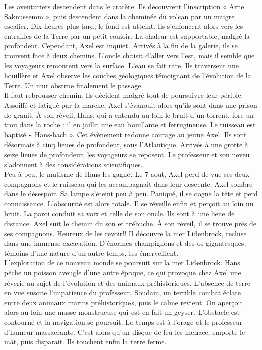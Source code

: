 \documentclass[12pt,a4paper]{article}
\begin{document}
{Les aventuriers descendent dans le cratère.
Ils découvrent l’inscription « Arne Saknussemm », puis descendent dans la cheminée du volcan par un maigre escalier.
Dix heures plus tard, le fond est atteint.
Ils s’enfoncent alors vers les entrailles de la Terre par un petit couloir.
La chaleur est supportable, malgré la profondeur.
Cependant, Axel est inquiet.
Arrivés à la fin de la galerie, ils se trouvent face à deux chemins.
L’oncle choisit d’aller vers l’est, mais il semble que les voyageurs remontent vers la surface.
L’eau se fait rare.
Ils traversent une houillère et Axel observe les couches géologiques témoignant de l’évolution de la Terre.
Un mur obstrue finalement le passage.\\

Il faut rebrousser chemin.
Ils décident malgré tout de poursuivre leur périple.
Assoiffé et fatigué par la marche, Axel s’évanouit alors qu’ils sont dans une prison de granit.
À son réveil, Hans, qui a entendu au loin le bruit d’un torrent, fore un trou dans la roche : il en jaillit une eau bouillante et ferrugineuse.
Le ruisseau est baptisé « Hans-bach ».
Cet évènement redonne courage au jeune Axel.
Ils sont désormais à cinq lieues de profondeur, sous l’Atlantique.
Arrivés à une grotte à seize lieues de profondeur, les voyageurs se reposent. 
Le professeur et son neveu s’adonnent à des considérations scientifiques.\\

Peu à peu, le mutisme de Hans les gagne.
Le 7 aout, Axel perd de vue ses deux compagnons et le ruisseau qui les accompagnait dans leur descente.
Axel sombre dans le désespoir.
Sa lampe s’éteint peu à peu.
Paniqué, il se cogne la tête et perd connaissance.
L’obscurité est alors totale.
Il se réveille enfin et perçoit au loin un bruit.
La paroi conduit sa voix et celle de son oncle.
Ils sont à une lieue de distance.
Axel suit le chemin du son et trébuche.
À son réveil, il se trouve près de ses compagnons. Heureux de les revoir!!
Il découvre la mer Lidenbrock, recluse dans une immense excavation.
D’énormes champignons et des os gigantesques, témoins d’une nature d’un autre temps, les émerveillent.\\

L’exploration de ce nouveau monde se poursuit sur la mer Lidenbrock. 
Hans pêche un poisson aveugle d’une autre époque, ce qui provoque chez Axel une rêverie au sujet de l’évolution et des animaux préhistoriques. 
L’absence de terre en vue suscite l’impatience du professeur. 
Soudain, un terrible combat éclate entre deux animaux marins préhistoriques, puis le calme revient. 
On aperçoit alors au loin une masse monstrueuse qui est en fait un geyser. 
L’obstacle est contourné et la navigation se poursuit.
Le temps est à l’orage et le professeur d’humeur massacrante. 
C’est alors qu’un disque de feu les menace, emporte le mât, puis disparait. 
Ils touchent enfin la terre ferme.\\

}
\end{document}
